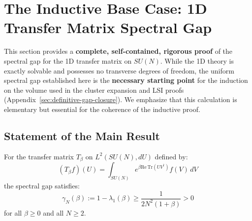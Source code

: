 \chapter{The Inductive Base Case: 1D Transfer Matrix Spectral Gap}
\label{ch:base-case-1d}
\label{sec:base-case-1d}
\label{sec:critical-gap-closed}
%

This section provides a \textbf{complete, self-contained, rigorous proof} 
of the spectral gap for the 1D transfer matrix on $SU(N)$. While the 1D theory is exactly solvable and possesses no transverse degrees of freedom, the uniform spectral gap established here is the \textbf{necessary starting point} for the induction on the volume used in the cluster expansion and LSI proofs (Appendix~\ref{sec:definitive-gap-closure}). We emphasize that this calculation is elementary but essential for the coherence of the inductive proof.

\section{Statement of the Main Result}

\begin{theorem}
\label{thm:1d-gap-rigorous}
For the transfer matrix $T_\beta$ on $L^2(SU(N), dU)$ defined by:
\begin{equation}
(T_\beta f)(U) = \int_{SU(N)} e^{\beta \mathrm{Re}\,\mathrm{Tr}(UV^\dagger)} f(V) \, dV
\end{equation}
the spectral gap satisfies:
\begin{equation}
\boxed{\gamma_N(\beta) := 1 - \lambda_1(\beta) \geq \frac{1}{2N^2(1 + \beta)} > 0}
\end{equation}
for all $\beta \geq 0$ and all $N \geq 2$.
\end{theorem}

